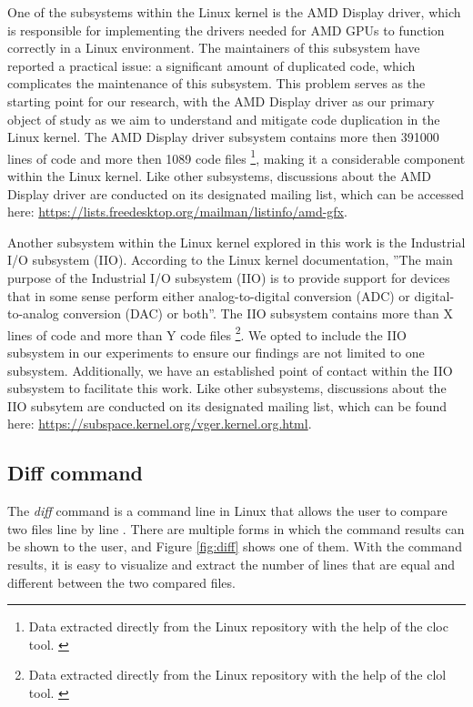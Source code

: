 One of the subsystems within the Linux kernel is the AMD Display driver, which
is responsible for implementing the drivers needed for AMD GPUs to function
correctly in a Linux environment. The maintainers of this subsystem have
reported a practical issue: a significant amount of duplicated code, which
complicates the maintenance of this subsystem. This problem serves as the
starting point for our research, with the AMD Display driver as our primary
object of study as we aim to understand and mitigate code duplication in the
Linux kernel. The AMD Display driver subsystem contains more then 391000 lines 
of code and more then 1089 code files
\footnote{ 
Data extracted directly from the Linux repository with the help of the cloc tool.
\citep{cloc}
}, 
making it a considerable component within the Linux kernel. Like other 
subsystems, discussions about the AMD Display driver are conducted on its 
designated mailing list, which can be accessed here: 
\url{https://lists.freedesktop.org/mailman/listinfo/amd-gfx}.

Another subsystem within the Linux kernel explored in this work is the
Industrial I/O subsystem (IIO). According to the Linux kernel documentation, 
''The main purpose of the Industrial I/O subsystem (IIO) is to provide support 
for devices that in some sense perform either analog-to-digital conversion (ADC) 
or digital-to-analog conversion (DAC) or both''\citep{iiodoc}. The IIO subsystem 
contains more than X lines of code and more than Y code files
\footnote{
Data extracted directly from the Linux repository with the help of the clol tool. \citep{cloc}
}.
We opted to include the IIO subsystem in our experiments to ensure our findings 
are not limited to one subsystem. Additionally, we have an established point of
contact within the IIO subsystem to facilitate this work.
Like other subsystems, discussions about the IIO subsytem are conducted on its 
designated mailing list, which can be found here: 
\url{https://subspace.kernel.org/vger.kernel.org.html}.


\subsection{Diff command}

The \textit{diff} command is a command line in Linux that allows the user to compare 
two files line by line \citep{diffcommand}. There are multiple forms in which the command 
results can be shown to the user, and Figure \ref{fig:diff} shows one of them. 
With the command results, it is easy to visualize and extract the number of lines that 
are equal and different between the two compared files.

